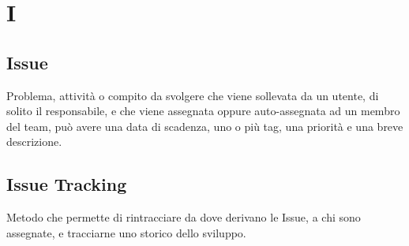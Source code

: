 \section*{I}

\subsection{Issue}
Problema, attività o compito da svolgere che viene sollevata da un utente, di solito il responsabile, e che viene assegnata oppure auto-assegnata ad un membro del team, può avere una data di scadenza, uno o più tag, una priorità e una breve descrizione.

\subsection{Issue Tracking}
Metodo che permette di rintracciare da dove derivano le Issue, a chi sono assegnate, e tracciarne uno storico dello sviluppo.
